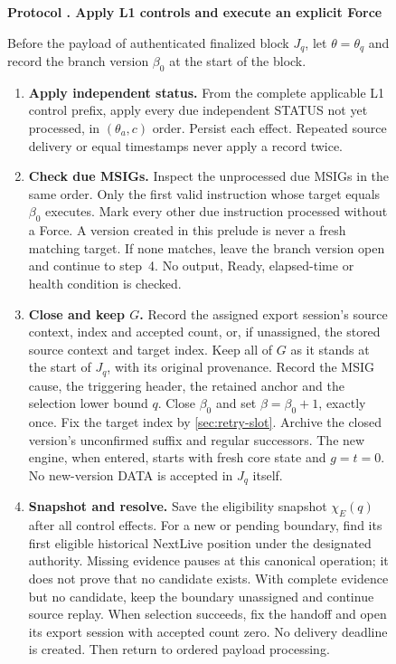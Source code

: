 \documentclass[11pt,a4paper]{article}
\newcounter{protocol}
\newenvironment{protocol}[3][htbp]{\begin{figure}[#1]\refstepcounter{protocol}\label{#2}
\begin{mdframed}[linewidth=.6pt,skipabove=0pt,skipbelow=0pt,
innertopmargin=7pt,innerbottommargin=7pt]\small
\textbf{Protocol \theprotocol. #3}\par\smallskip}{\end{mdframed}\end{figure}}
\begin{document}
\begin{protocol}{alg:force}{Apply L1 controls and execute an explicit Force}
Before the payload of authenticated finalized block $J_q$, let
$\theta=\theta_q$ and record the branch version $\beta_0$ at the start
of the block.
\begin{enumerate}[label=\textbf{\arabic*)},itemsep=3pt]
\item \textbf{Apply independent status.}
From the complete applicable L1 control prefix, apply every due
independent STATUS not yet processed, in $(\theta_a,c)$ order. Persist
each effect. Repeated source delivery or equal timestamps never apply a
record twice.

\item \textbf{Check due MSIGs.}
Inspect the unprocessed due MSIGs in the same order. Only the first
valid instruction whose target equals $\beta_0$ executes. Mark every
other due instruction processed without a Force. A version created in
this prelude is never a fresh matching target. If none matches, leave
the branch version open and continue to step~4. No output, Ready,
elapsed-time or health condition is checked.

\item \textbf{Close and keep $G$.}
Record the assigned export session's source context, index and accepted
count, or, if unassigned, the stored source context and target index.
Keep all of $G$ as it stands at the start of $J_q$, with its original
provenance. Record the MSIG cause, the triggering header, the retained
anchor and the selection lower bound $q$. Close $\beta_0$ and set
$\beta=\beta_0+1$, exactly once. Fix the target index by
\cref{sec:retry-slot}. Archive the closed version's unconfirmed suffix
and regular successors. The new engine, when entered, starts with fresh
core state and $g=t=0$. No new-version DATA is accepted in $J_q$ itself.

\item \textbf{Snapshot and resolve.}
Save the eligibility snapshot $\chi_E(q)$ after all control effects.
For a new or pending boundary, find its first eligible historical
NextLive position under the designated authority. Missing evidence
pauses at this canonical operation; it does not prove that no candidate
exists. With complete evidence but no candidate, keep the boundary
unassigned and continue source replay. When selection succeeds, fix the
handoff and open its export session with accepted count zero. No delivery
deadline is created. Then return to ordered payload processing.
\end{enumerate}
\end{protocol}
\end{document}

